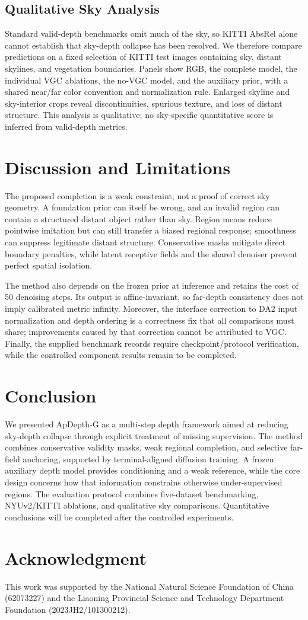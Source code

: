 \documentclass[10pt,journal,a4paper]{IEEEtran}
\begin{document}
\subsection{Qualitative Sky Analysis}
\label{sec:sky_eval}
Standard valid-depth benchmarks omit much of the sky, so KITTI AbsRel alone cannot establish that sky-depth collapse has been resolved. We therefore compare predictions on a fixed selection of KITTI test images containing sky, distant skylines, and vegetation boundaries. Panels show RGB, the complete model, the individual VGC ablations, the no-VGC model, and the auxiliary prior, with a shared near/far color convention and normalization rule. Enlarged skyline and sky-interior crops reveal discontinuities, spurious texture, and loss of distant structure. This analysis is qualitative; no sky-specific quantitative score is inferred from valid-depth metrics.

\section{Discussion and Limitations}
\label{sec:limitations}
The proposed completion is a weak constraint, not a proof of correct sky geometry. A foundation prior can itself be wrong, and an invalid region can contain a structured distant object rather than sky. Region means reduce pointwise imitation but can still transfer a biased regional response; smoothness can suppress legitimate distant structure. Conservative masks mitigate direct boundary penalties, while latent receptive fields and the shared denoiser prevent perfect spatial isolation.

The method also depends on the frozen prior at inference and retains the cost of 50 denoising steps. Its output is affine-invariant, so far-depth consistency does not imply calibrated metric infinity. Moreover, the interface correction to DA2 input normalization and depth ordering is a correctness fix that all comparisons must share; improvements caused by that correction cannot be attributed to VGC. Finally, the supplied benchmark records require checkpoint/protocol verification, while the controlled component results remain to be completed.

\section{Conclusion}
\label{sec:conclusion}
We presented ApDepth-G as a multi-step depth framework aimed at reducing sky-depth collapse through explicit treatment of missing supervision. The method combines conservative validity masks, weak regional completion, and selective far-field anchoring, supported by terminal-aligned diffusion training. A frozen auxiliary depth model provides conditioning and a weak reference, while the core design concerns how that information constrains otherwise under-supervised regions. The evaluation protocol combines five-dataset benchmarking, NYUv2/KITTI ablations, and qualitative sky comparisons. Quantitative conclusions will be completed after the controlled experiments.
\section*{Acknowledgment}
This work was supported by the National Natural Science Foundation of China (62073227) and the Liaoning Provincial Science and Technology Department Foundation (2023JH2/101300212).



\end{document}
